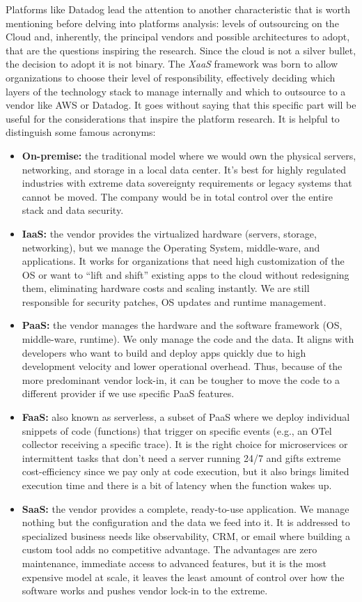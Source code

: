 \documentclass[12pt,a4paper,openright,twoside]{book}
\begin{document}
Platforms like Datadog lead the attention to another characteristic that is worth mentioning before delving into platforms analysis: levels of outsourcing on the Cloud and, inherently, the principal vendors and possible architectures to adopt, that are the questions inspiring the research. 
Since the cloud is not a silver bullet, the decision to adopt it is not binary. The \textit{\ac{XaaS}} framework was born to allow organizations to choose their level of responsibility, effectively deciding which layers of the technology stack to manage internally and which to outsource to a vendor like AWS or Datadog. It goes without saying that this specific part will be useful for the considerations that inspire the platform research. It is helpful to distinguish some famous acronyms: 
\begin{itemize}
    \item \textbf{On-premise:} the traditional model where we would own the physical servers, networking, and storage in a local data center. It's best for highly regulated industries with extreme data sovereignty requirements or legacy systems that cannot be moved. The company would be in total control over the entire stack and data security. 
    \item \textbf{\ac{IaaS}:} the vendor provides the virtualized hardware (servers, storage, networking), but we manage the Operating System, middle-ware, and applications. It works for organizations that need high customization of the \ac{OS} or want to ``lift and shift'' existing apps to the cloud without redesigning them, eliminating hardware costs and scaling instantly. We are still responsible for security patches, \ac{OS} updates and runtime management.
    \item \textbf{\ac{PaaS}:} the vendor manages the hardware and the software framework (OS, middle-ware, runtime). We only manage the code and the data. It aligns with developers who want to build and deploy apps quickly due to high development velocity and lower operational overhead. Thus, because of the more predominant vendor lock-in, it can be tougher to move the code to a different provider if we use specific PaaS features.
    \item \textbf{\ac{FaaS}:} also known as serverless, a subset of PaaS where we deploy individual snippets of code (functions) that trigger on specific events (e.g., an OTel collector receiving a specific trace). It is the right choice for microservices or intermittent tasks that don't need a server running 24/7 and gifts extreme cost-efficiency since we pay only at code execution, but it also brings limited execution time and there is a bit of latency when the function wakes up. 
    \item \textbf{\ac{SaaS}:} the vendor provides a complete, ready-to-use application. We manage nothing but the configuration and the data we feed into it. It is addressed to specialized business needs like observability, CRM, or email where building a custom tool adds no competitive advantage. The advantages are zero maintenance, immediate access to advanced features, but it is the most expensive model at scale, it leaves the least amount of control over how the software works and pushes vendor lock-in to the extreme. 
\end{itemize}
\end{document}

